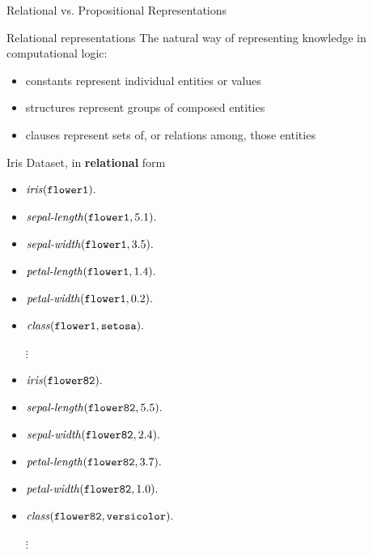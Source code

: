 \documentclass[presentation]{beamer}\mode<presentation>{\usetheme{AMSBolognaFC}}
\begin{document}
\begin{frame}[allowframebreaks]{Relational vs. Propositional Representations}
    \begin{block}{Relational representations}
        The natural way of representing knowledge in computational logic:
        \begin{itemize}
            \item constants represent individual entities or values
            \item structures represent groups of composed entities
            \item clauses represent sets of, or relations among, those entities
        \end{itemize}
    \end{block}

    \begin{exampleblock}{Iris Dataset, in \textbf{relational} form}
        \begin{multicols}{2}
            \begin{itemize}
                \item $\text{\textit{iris}}(\mathtt{flower1}) \mathtt{.}$
                \item $\text{\textit{sepal-length}}(\mathtt{flower1}, 5.1) \mathtt{.}$
                \item $\text{\textit{sepal-width}}(\mathtt{flower1}, 3.5) \mathtt{.}$
                \item $\text{\textit{petal-length}}(\mathtt{flower1}, 1.4) \mathtt{.}$
                \item $\text{\textit{petal-width}}(\mathtt{flower1}, 0.2) \mathtt{.}$
                \item $\text{\textit{class}}(\mathtt{flower1}, \mathtt{setosa}) \mathtt{.}$
                \item[$\vdots$]
                \item $\text{\textit{iris}}(\mathtt{flower82}) \mathtt{.}$
                \item $\text{\textit{sepal-length}}(\mathtt{flower82}, 5.5) \mathtt{.}$
                \item $\text{\textit{sepal-width}}(\mathtt{flower82}, 2.4) \mathtt{.}$
                \item $\text{\textit{petal-length}}(\mathtt{flower82}, 3.7) \mathtt{.}$
                \item $\text{\textit{petal-width}}(\mathtt{flower82}, 1.0) \mathtt{.}$
                \item $\text{\textit{class}}(\mathtt{flower82}, \mathtt{versicolor}) \mathtt{.}$
                \item[$\vdots$]
            \end{itemize}
        \end{multicols}
    \end{exampleblock}
\end{frame}
\end{document}
